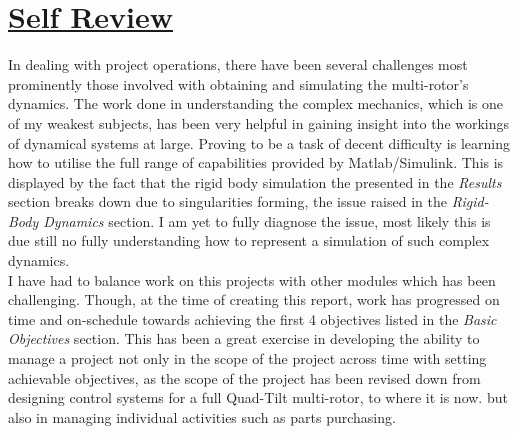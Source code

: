 \documentclass[12pt,a4paper,twoside]{report}
\begin{document}
	\newpage
	
	\section*{\underline{Self Review}}
		
		In dealing with project operations, there have been several challenges most prominently those involved with obtaining and simulating the multi-rotor's dynamics. The work done in understanding the complex mechanics, which is one of my weakest subjects, has been very helpful in gaining insight into the workings of dynamical systems at large. Proving to be a task of decent difficulty is learning how to utilise the full range of capabilities provided by Matlab/Simulink. This is displayed by the fact that the rigid body simulation the presented in the \emph{Results} section breaks down due to singularities forming, the issue raised in the \emph{Rigid-Body Dynamics} section. I am yet to fully diagnose the issue, most likely this is due still no fully understanding how to represent a simulation of such complex dynamics.
		\\	   
		I have had to balance work on this projects with other modules which has been challenging. Though, at the time of creating this report, work has progressed on time and on-schedule towards achieving the first 4 objectives listed in the \emph{Basic Objectives} section. This has been a great exercise in developing the ability to manage a project not only in the scope of the project across time with setting achievable objectives, as the scope of the project has been revised down from designing control systems for a full Quad-Tilt multi-rotor, to where it is now.  but also in managing individual activities such as parts purchasing.
		
		
	\newpage
	
\end{document}
